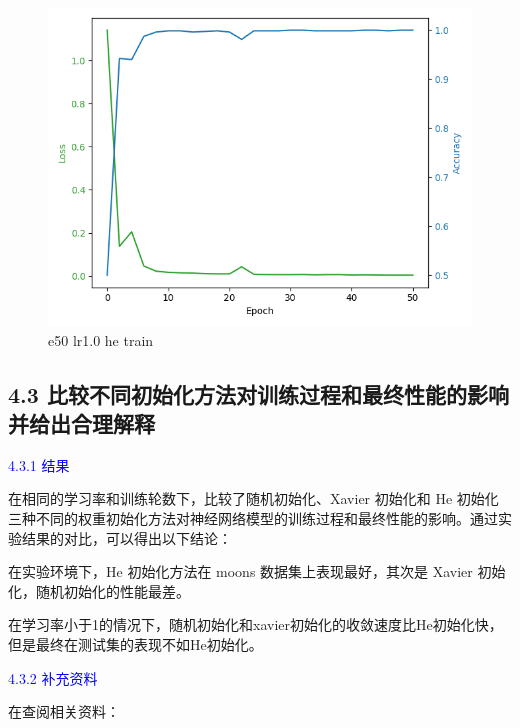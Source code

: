 \documentclass[8pt]{article}
\begin{document}
\begin{figure}[H]
    \begin{minipage}{0.32\textwidth}
        \centering
        \includegraphics[width=\textwidth]{../Prob4/out/1024_173617/e50_lr1_btz16_he/training_process.png}
        \caption{e50 lr1.0 he train}
        \label{fig:e50 lr1.0 he train}
    \end{minipage}
\end{figure}


\subsection*{4.3 比较不同初始化方法对训练过程和最终性能的影响并给出合理解释}

\textcolor{blue}{4.3.1 结果}

在相同的学习率和训练轮数下，比较了随机初始化、Xavier 初始化和 He 初始化三种不同的权重初始化方法对神经网络模型的训练过程和最终性能的影响。通过实验结果的对比，可以得出以下结论：

在实验环境下，He 初始化方法在 moons 数据集上表现最好，其次是 Xavier 初始化，随机初始化的性能最差。

在学习率小于1的情况下，随机初始化和xavier初始化的收敛速度比He初始化快，但是最终在测试集的表现不如He初始化。

\textcolor{blue}{4.3.2 补充资料}

在查阅相关资料：
\end{document}
